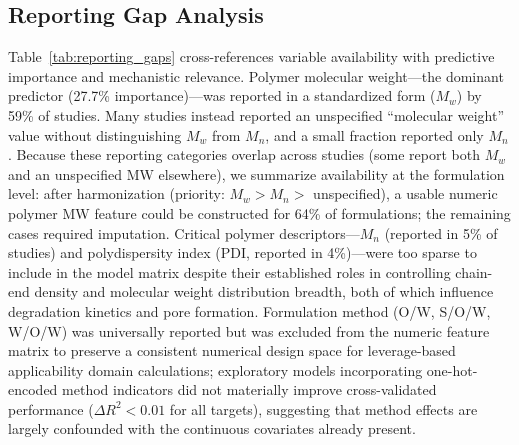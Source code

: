 \FloatBarrier

\subsection{Reporting Gap Analysis}
\label{sec:reporting_gaps}

Table~\ref{tab:reporting_gaps} cross-references variable availability with predictive importance and mechanistic relevance. Polymer molecular weight---the dominant predictor (27.7\% importance)---was reported in a standardized form ($M_w$) by 59\% of studies. Many studies instead reported an unspecified ``molecular weight'' value without distinguishing $M_w$ from $M_n$, and a small fraction reported only $M_n$. Because these reporting categories overlap across studies (some report both $M_w$ and an unspecified MW elsewhere), we summarize availability at the formulation level: after harmonization (priority: $M_w > M_n >$ unspecified), a usable numeric polymer MW feature could be constructed for 64\% of formulations; the remaining cases required imputation. Critical polymer descriptors---$M_n$ (reported in 5\% of studies) and polydispersity index (PDI, reported in 4\%)---were too sparse to include in the model matrix despite their established roles in controlling chain-end density and molecular weight distribution breadth, both of which influence degradation kinetics and pore formation. Formulation method (O/W, S/O/W, W/O/W) was universally reported but was excluded from the numeric feature matrix to preserve a consistent numerical design space for leverage-based applicability domain calculations; exploratory models incorporating one-hot-encoded method indicators did not materially improve cross-validated performance ($\Delta R^2 < 0.01$ for all targets), suggesting that method effects are largely confounded with the continuous covariates already present.

